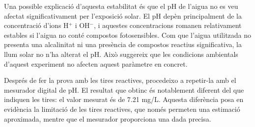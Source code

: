 Una possible explicació d’aquesta estabilitat és que el pH de l’aigua no es veu afectat significativament per l’exposició solar. El pH depèn principalment de la concentració d’ions H$^+$ i OH$^-$, i aquestes concentracions romanen relativament estables si l’aigua no conté compostos fotosensibles. Com que l’aigua utilitzada no presenta una alcalinitat ni una presència de compostos reactius significativa, la llum solar no n’ha alterat el pH. Això suggereix que les condicions ambientals d’aquest experiment no afecten aquest paràmetre en concret.

Després de fer la prova amb les tires reactives, procedeixo a repetir-la amb el mesurador digital de pH. El resultat que obtinc és notablement diferent del que indiquen les tires: el valor mesurat és de 7.21 mg/L. Aquesta diferència posa en evidència la limitació de les tires reactives, que només permeten una estimació aproximada, mentre que el mesurador proporciona una dada precisa.

